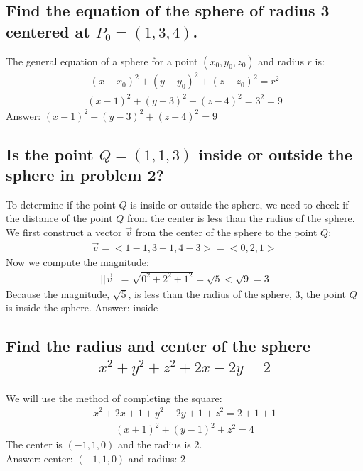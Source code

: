 \documentclass{article}
\begin{document}
\subsection{Find the equation of the sphere of radius 3 centered at $P_0 = (1, 3, 4)$.}
The general equation of a sphere for a point $(x_0, y_0, z_0)$ and radius $r$ is:
\begin{align*}
	(x - x_0)^2 + (y - y_0)^2 + (z - z_0)^2 = r^2
\end{align*}
\begin{align*}
	(x - 1)^2 + (y - 3)^2 + (z - 4)^2 = 3^2 = 9
\end{align*}
Answer: $(x - 1)^2 + (y - 3)^2 + (z - 4)^2 = 9$
\subsection{Is the point $Q = (1, 1, 3)$ inside or outside the sphere in problem 2?}
To determine if the point $Q$ is inside or outside the sphere, we need to check if the distance of the point $Q$ from the center is less than the radius of the sphere. \\[10pt]
We first construct a vector $\vec{v}$ from the center of the sphere to the point $Q$:
\begin{align*}
	\vec{v} = <1 - 1, 3 - 1, 4 - 3> = <0, 2, 1>
\end{align*}
Now we compute the magnitude:
\begin{align*}
	|| \vec{v} || = \sqrt{0^2 + 2^2 + 1^2} = \sqrt{5} < \sqrt{9} = 3
\end{align*}
Because the magnitude, $\sqrt{5}$, is less than the radius of the sphere, $3$, the point $Q$ is inside the sphere.
Answer: inside
\subsection{Find the radius and center of the sphere
	\begin{align*}
		x^2 + y^2 + z^2 + 2x - 2y = 2
	\end{align*}
}
We will use the method of completing the square:
\begin{align*}
	x^2 + 2x + 1 + y^2 - 2y + 1 + z^2 = 2 + 1 + 1
\end{align*}
\begin{align*}
	(x + 1)^2 + (y - 1)^2 + z^2 = 4
\end{align*}
The center is $(-1, 1, 0)$ and the radius is $2$. \\[10pt]
Answer: center: $(-1, 1, 0)$ and radius: $2$
\end{document}
